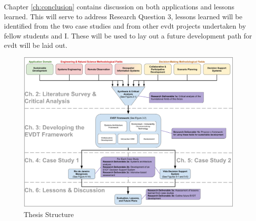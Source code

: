 Chapter \ref{ch:conclusion} contains discussion on both applications and lessons learned. This will serve to address Research Question 3, lessons learned will be identified from the two case studies and from other \ac{evdt} projects undertaken by fellow students and I. These will be used to lay out a future development path for \ac{evdt} will be laid out.

\clearpage
\begin{landscape}
\begin{figure}[t]
	\centering
	\includegraphics[scale=0.3]{Figures/chap1/structure.png}
	\caption[Thesis Structure]{Thesis Structure}
	\label{fig:structure}
\end{figure}
\end{landscape}
 


